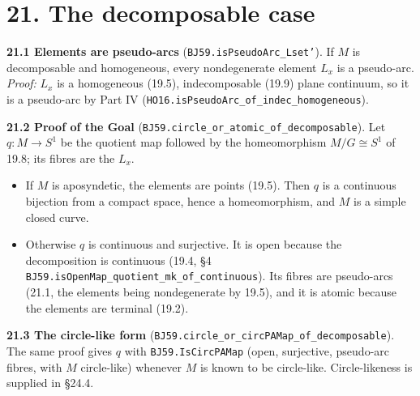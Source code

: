 \documentclass[11pt]{article}
\newcommand{\lean}[1]{\texttt{#1}}
\begin{document}
\section*{21. The decomposable case}

\textbf{21.1 Elements are pseudo-arcs} (\lean{BJ59.\hspace{0pt}isPseudoArc\_\hspace{0pt}Lset'}). If $M$ is decomposable and homogeneous, every nondegenerate element $L_x$ is a pseudo-arc. \emph{Proof:} $L_x$ is a homogeneous (19.5), indecomposable (19.9) plane continuum, so it is a pseudo-arc by Part IV (\lean{HO16.\hspace{0pt}isPseudoArc\_\hspace{0pt}of\_\hspace{0pt}indec\_\hspace{0pt}homogeneous}).

\textbf{21.2 Proof of the Goal} (\lean{BJ59.\hspace{0pt}circle\_\hspace{0pt}or\_\hspace{0pt}atomic\_\hspace{0pt}of\_\hspace{0pt}decomposable}). Let $q : M \to S^1$ be the quotient map followed by the homeomorphism $M/G \cong S^1$ of 19.8; its fibres are the $L_x$.

\begin{itemize}
  \item If $M$ is aposyndetic, the elements are points (19.5). Then $q$ is a continuous bijection from a compact space, hence a homeomorphism, and $M$ is a simple closed curve.
  \item Otherwise $q$ is continuous and surjective. It is open because the decomposition is continuous (19.4, \S{}4 \lean{BJ59.\hspace{0pt}isOpenMap\_\hspace{0pt}quotient\_\hspace{0pt}mk\_\hspace{0pt}of\_\hspace{0pt}continuous}). Its fibres are pseudo-arcs (21.1, the elements being nondegenerate by 19.5), and it is atomic because the elements are terminal (19.2).
\end{itemize}

\textbf{21.3 The circle-like form} (\lean{BJ59.\hspace{0pt}circle\_\hspace{0pt}or\_\hspace{0pt}circPAMap\_\hspace{0pt}of\_\hspace{0pt}decomposable}). The same proof gives $q$ with \lean{BJ59.\hspace{0pt}IsCircPAMap} (open, surjective, pseudo-arc fibres, with $M$ circle-like) whenever $M$ is known to be circle-like. Circle-likeness is supplied in \S{}24.4.
\end{document}
